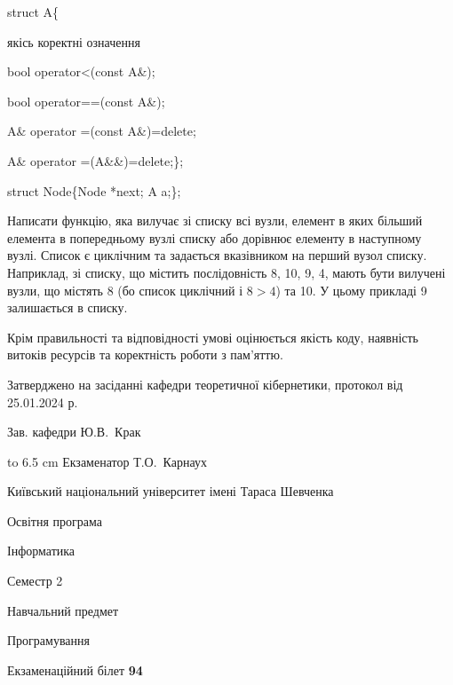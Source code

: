 \documentclass[12pt, ukrainian]{article}
\begin{document}
{struct A\{

\quad  якісь коректні означення 

\quad  bool operator<(const A\&); 

\quad  bool operator==(const A\&); 

\quad A\& operator =(const A\&)=delete; 

\quad  A\& operator =(A\&\&)=delete;\};

struct Node\{Node *next; A a;\};

 Написати функцію, яка вилучає зі списку всі вузли, елемент в яких більший елемента в попередньому вузлі списку або дорівнює елементу в наступному вузлі. Список є циклічним та задається вказівником на перший вузол списку. Наприклад, зі списку, що містить послідовність 8, 10, 9, 4, мають бути вилучені вузли, що містять 8 (бо список циклічний і $8>4$) та 10. У цьому прикладі 9 залишається в списку.

Крім правильності та відповідності умові оцінюється якість коду, наявність витоків ресурсів та коректність роботи з пам'яттю. 

}
{\smallskip\smallskip \begin {scriptsize} Затверджено на засіданні кафедри теоретичної кібернетики, протокол   від   25.01.2024 р.\par\smallskip\smallskip\smallskip\smallskip
{\parbox {6.5 cm} {Зав. кафедри \dotfill Ю.В.~Крак}}\hspace {0.7cm} {\hbox to 6.5 cm { Екзаменатор \dotfill Т.О.~Карнаух}} \end{scriptsize}}
\newpage
{{\begin {scriptsize}\par
{ \center  Київський національний університет імені Тараса Шевченка \par}
{\parbox {5 cm}{Освітня програма \hfill}{\parbox {7 cm}{Інформатика\hfill}}\parbox {6 cm}{\hfill Семестр 2}}\par
{\parbox {5 cm} {Навчальний предмет \hfill}\parbox {7 cm}{Програмування \hfill}\parbox {6cm}{\hfill}\par}\vspace{-15pt} \end{scriptsize}}{\center Екзаменаційний білет \No \textbf { 94 }\par}}
\end{document}
